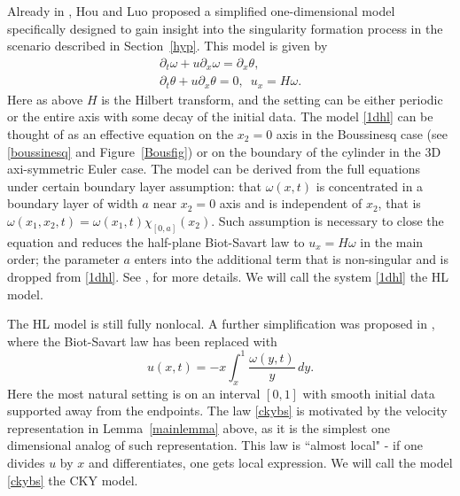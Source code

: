\documentclass[reqno,centertags, 11pt]{amsart}
\newcommand{\be}{\mathbf e} \newcommand{\bh}{\mathbf h}
\renewcommand{\be}{\begin{equation}}
\newcommand{\ee}{\end{equation}}
\begin{document}
Already in \cite{HouLuo}, Hou and Luo proposed a simplified one-dimensional model specifically designed
to gain insight into the singularity formation process in the scenario described in Section~\ref{hyp}.
This model is given by
\begin{eqnarray}
\partial_t \omega + u \partial_x \omega = \partial_x \theta, \nonumber \\
\partial_t \theta + u \partial_x \theta = 0, \,\,\, u_x = H \omega.
\label{1dhl}
\end{eqnarray}
Here as above $H$ is the Hilbert transform, and the setting can be either periodic or the entire axis with some decay of the initial data.
The model \eqref{1dhl} can be thought of as an effective equation on the $x_2=0$ axis in the Boussinesq case
(see \eqref{boussinesq} and Figure~\ref{Bousfig}) or on the boundary of the cylinder in the 3D axi-symmetric Euler case.
The model can be derived from the full equations under certain boundary layer assumption:
that $\omega(x,t)$ is concentrated in a boundary layer of width $a$ near $x_2=0$ axis and is independent of $x_2$,
that is
$\omega(x_1,x_2,t) = \omega(x_1,t) \chi_{[0,a]}(x_2).$
Such assumption is necessary to close the equation and reduces the half-plane Biot-Savart law to $u_x=H\omega$ in the main order;
the parameter $a$ enters into the additional term that is non-singular and is dropped from \eqref{1dhl}.
See \cite{HouLuo}, \cite{CHKLSY} for more details. We will call the system \eqref{1dhl} the HL model.

The HL model is still fully nonlocal. A further simplification was proposed in \cite{CKY}, where the Biot-Savart law
has been replaced with
\be\label{ckybs}
u(x,t) = - x \int_x^1 \frac{\omega(y,t)}{y}\,dy.
\ee
Here the most natural setting is on an interval $[0,1]$ with smooth initial data supported away from the endpoints.
The law \eqref{ckybs} is motivated by the velocity representation in Lemma~\ref{mainlemma} above, as it is the simplest one dimensional
analog of such representation. This law is ``almost local" - if one divides $u$ by $x$ and differentiates, one gets local expression.
We will call the model \eqref{ckybs} the CKY model.
\end{document}

